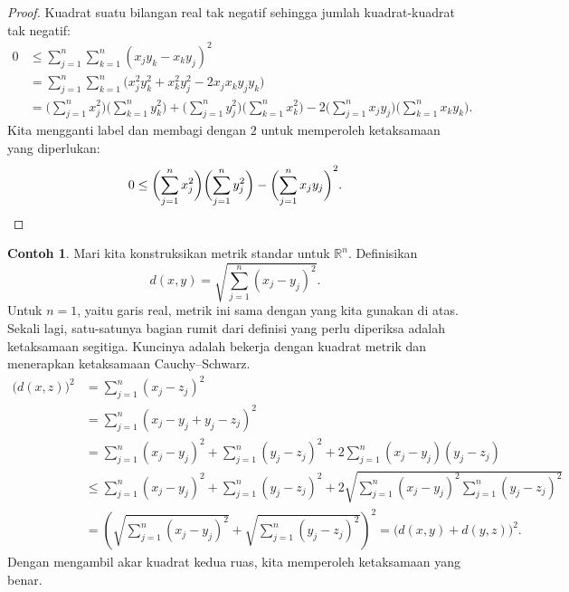 \documentclass[12pt,openany]{book}
\newcommand{\R}{{\mathbb{R}}}
\theoremstyle{plain}
\theoremstyle{remark}
\theoremstyle{definition}
\theoremstyle{exercise}
\theoremstyle{example}
\newtheorem{example}[thm]{Contoh}
\begin{document}
\begin{proof}
Kuadrat suatu bilangan real tak negatif sehingga jumlah kuadrat-kuadrat
tak negatif:
\begin{equation*}
\begin{split}
0 & \leq 
\sum_{j=1}^n \sum_{k=1}^n {(x_j y_k - x_k y_j)}^2
\\
& =
\sum_{j=1}^n \sum_{k=1}^n \bigl( x_j^2 y_k^2 + x_k^2 y_j^2 - 2 x_j x_k y_j
y_k \bigr)
\\
& =
\biggl( \sum_{j=1}^n x_j^2 \biggr)
\biggl( \sum_{k=1}^n y_k^2 \biggr)
+
\biggl( \sum_{j=1}^n y_j^2 \biggr)
\biggl( \sum_{k=1}^n x_k^2 \biggr)
-
2
\biggl( \sum_{j=1}^n x_j y_j \biggr)
\biggl( \sum_{k=1}^n x_k y_k \biggr) .
\end{split}
\end{equation*}
Kita mengganti label dan membagi dengan $2$ untuk memperoleh ketaksamaan yang diperlukan:
\begin{equation*}
0 \leq 
\biggl( \sum_{j=1}^n x_j^2 \biggr)
\biggl( \sum_{j=1}^n y_j^2 \biggr)
-
{\biggl( \sum_{j=1}^n x_j y_j \biggr)}^2 . \qedhere
\end{equation*}
\end{proof}

\begin{example}
Mari kita konstruksikan
metrik standar\index{metrik standar pada $\R^n$} untuk $\R^n$.  Definisikan
\begin{equation*}
d(x,y) =
\sqrt{
\sum_{j=1}^n
{(x_j-y_j)}^2 
} .
\end{equation*}
Untuk $n=1$, yaitu garis real, metrik ini sama dengan yang kita gunakan di atas.  Sekali lagi,
satu-satunya bagian rumit dari definisi yang perlu diperiksa adalah ketaksamaan segitiga.
Kuncinya adalah bekerja dengan 
kuadrat metrik dan menerapkan
ketaksamaan Cauchy--Schwarz.
\begin{equation*}
\begin{split}
{\bigl(d(x,z)\bigr)}^2 & =
\sum_{j=1}^n
{(x_j-z_j)}^2 
\\
& =
\sum_{j=1}^n
{(x_j-y_j+y_j-z_j)}^2 
\\
& =
\sum_{j=1}^n
{(x_j-y_j)}^2
+
\sum_{j=1}^n
{(y_j-z_j)}^2 
+
2
\sum_{j=1}^n
(x_j-y_j)(y_j-z_j)
\\
& \leq
\sum_{j=1}^n
{(x_j-y_j)}^2
+
\sum_{j=1}^n
{(y_j-z_j)}^2 
+
2
\sqrt{
\sum_{j=1}^n
{(x_j-y_j)}^2
\sum_{j=1}^n
{(y_j-z_j)}^2
}
\\
& =
{\left(
\sqrt{
\sum_{j=1}^n
{(x_j-y_j)}^2
}
+
\sqrt{
\sum_{j=1}^n
{(y_j-z_j)}^2 
}
\right)}^2
=
{\bigl( d(x,y) + d(y,z) \bigr)}^2 .
\end{split}
\end{equation*}
Dengan mengambil akar kuadrat kedua ruas, kita memperoleh ketaksamaan yang benar.
\end{example}
\end{document}
